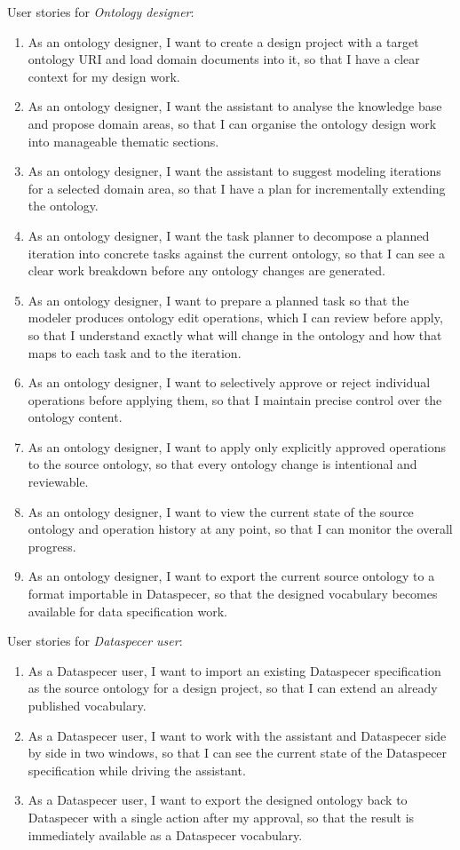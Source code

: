 \documentclass{article}
\def\twodigits#1{%
    \ifnum#1<10 0\fi
    \number#1}%
\begin{document}
User stories for \textit{Ontology designer}:
\begin{enumerate}[label=\textbf{US-\protect\twodigits{\arabic*}:},align=left,leftmargin=1.4cm]
  \item As an ontology designer, I want to create a design project with a target ontology URI and load domain documents into it, so that I have a clear context for my design work.
  \item As an ontology designer, I want the assistant to analyse the knowledge base and propose domain areas, so that I can organise the ontology design work into manageable thematic sections.
  \item As an ontology designer, I want the assistant to suggest modeling iterations for a selected domain area, so that I have a plan for incrementally extending the ontology.
  \item As an ontology designer, I want the task planner to decompose a planned iteration into concrete tasks against the current ontology, so that I can see a clear work breakdown before any ontology changes are generated.
  \item As an ontology designer, I want to prepare a planned task so that the modeler produces ontology edit operations, which I can review before apply, so that I understand exactly what will change in the ontology and how that maps to each task and to the iteration.
  \item As an ontology designer, I want to selectively approve or reject individual operations before applying them, so that I maintain precise control over the ontology content.
  \item As an ontology designer, I want to apply only explicitly approved operations to the source ontology, so that every ontology change is intentional and reviewable.
  \item As an ontology designer, I want to view the current state of the source ontology and operation history at any point, so that I can monitor the overall progress.
  \item As an ontology designer, I want to export the current source ontology to a format importable in Dataspecer, so that the designed vocabulary becomes available for data specification work.
\end{enumerate}

User stories for \textit{Dataspecer user}:
\begin{enumerate}[resume,label=\textbf{US-\protect\twodigits{\arabic*}:},align=left,leftmargin=1.4cm]
  \item As a Dataspecer user, I want to import an existing Dataspecer specification as the source ontology for a design project, so that I can extend an already published vocabulary.
  \item As a Dataspecer user, I want to work with the assistant and Dataspecer side by side in two windows, so that I can see the current state of the Dataspecer specification while driving the assistant.
  \item As a Dataspecer user, I want to export the designed ontology back to Dataspecer with a single action after my approval, so that the result is immediately available as a Dataspecer vocabulary.
\end{enumerate}
\end{document}
